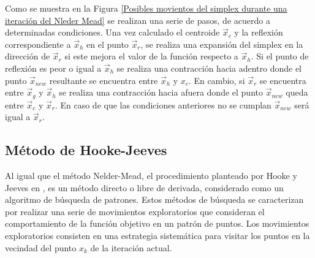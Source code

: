 Como se muestra en la Figura \ref{Posibles movientos del simplex durante una iteración del Nleder Mead} se realizan una serie de pasos, de acuerdo a determinadas condiciones. Una vez calculado el centroide $\vec{x}_c$ y la reflexión correspondiente a $\vec{x}_h$ en el punto $\vec{x}_r$, se realiza una expansión del simplex en la dirección de $\vec{x}_r$ si este mejora el valor de la función respecto a $\vec{x}_h$. Si el punto de reflexión es peor o igual a $\vec{x}_h$ se realiza una contracción hacia adentro donde el punto $\vec{x}_{new}$ resultante se encuentra entre $\vec{x}_h$ y $x_c$. En cambio, si $\vec{x}_r$ se encuentra entre $\vec{x}_g$ y $\vec{x}_h$ se realiza una contracción hacia afuera donde el punto $\vec{x}_{new}$ queda entre  $\vec{x}_c$ y $\vec{x}_r$. En caso de que las condiciones anteriores no se cumplan $\vec{x}_{new}$ será igual a $\vec{x}_r$.

\subsection{Método de Hooke-Jeeves}
Al igual que el método Nelder-Mead, el procedimiento planteado por Hooke y Jeeves en \cite{hooke1961direct}, es un método directo o libre de derivada, considerado como un algoritmo de búsqueda de patrones. Estos métodos de búsqueda se caracterizan por realizar una serie de movimientos exploratorios que consideran el comportamiento de la función objetivo en un patrón de puntos. Los movimientos exploratorios consisten en una estrategia sistemática para visitar los puntos en la vecindad del punto $x_k$ de la iteración actual.

